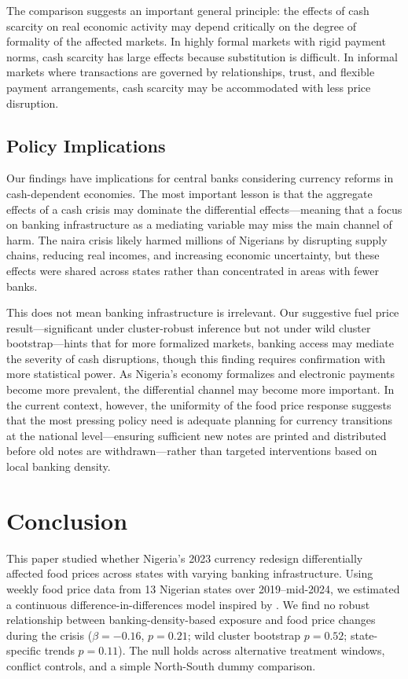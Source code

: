 \documentclass[12pt]{article}
\begin{document}
The comparison suggests an important general principle: the effects of cash scarcity on real economic activity may depend critically on the degree of formality of the affected markets. In highly formal markets with rigid payment norms, cash scarcity has large effects because substitution is difficult. In informal markets where transactions are governed by relationships, trust, and flexible payment arrangements, cash scarcity may be accommodated with less price disruption.

\subsection{Policy Implications}

Our findings have implications for central banks considering currency reforms in cash-dependent economies. The most important lesson is that the aggregate effects of a cash crisis may dominate the differential effects---meaning that a focus on banking infrastructure as a mediating variable may miss the main channel of harm. The naira crisis likely harmed millions of Nigerians by disrupting supply chains, reducing real incomes, and increasing economic uncertainty, but these effects were shared across states rather than concentrated in areas with fewer banks.

This does not mean banking infrastructure is irrelevant. Our suggestive fuel price result---significant under cluster-robust inference but not under wild cluster bootstrap---hints that for more formalized markets, banking access may mediate the severity of cash disruptions, though this finding requires confirmation with more statistical power. As Nigeria's economy formalizes and electronic payments become more prevalent, the differential channel may become more important. In the current context, however, the uniformity of the food price response suggests that the most pressing policy need is adequate planning for currency transitions at the national level---ensuring sufficient new notes are printed and distributed before old notes are withdrawn---rather than targeted interventions based on local banking density.


\section{Conclusion}

This paper studied whether Nigeria's 2023 currency redesign differentially affected food prices across states with varying banking infrastructure. Using weekly food price data from 13 Nigerian states over 2019--mid-2024, we estimated a continuous difference-in-differences model inspired by \citet{chodorow2020cash}. We find no robust relationship between banking-density-based exposure and food price changes during the crisis ($\beta = -0.16$, $p = 0.21$; wild cluster bootstrap $p = 0.52$; state-specific trends $p = 0.11$). The null holds across alternative treatment windows, conflict controls, and a simple North-South dummy comparison.
\end{document}
